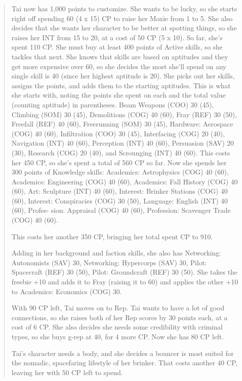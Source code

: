 \begin{quotation}
Tai now has 1,000 points to customize. She wants to be lucky, so she starts
right off spending 60 (4 x 15) CP to raise her Moxie from 1 to 5. She also
decides that she wants her character to be better at spotting things, so she
raises her INT from 15 to 20, at a cost of 50 CP (5 x 10). So far, she’s spent
110 CP.  She must buy at least 400 points of Active skills, so she tackles that
next. She knows that skills are based on aptitudes and they get more
expensive over 60, so she decides the most she’ll spend on any single skill is
40 (since her highest aptitude is 20). She picks out her skills, assigns the
points, and adds them to the starting aptitudes.  This is what she starts with,
noting the points she spent on each and the total value (counting aptitude) in
parentheses.  Beam Weapons (COO) 30 (45), Climbing (SOM) 30 (45), Demolitions
(COG) 40 (60), Fray (REF) 30 (50), Freefall (REF) 40 (60), Freerunning (SOM) 30
(45), Hardware: Aerospace (COG) 40 (60), Infiltration (COO) 30 (45),
Interfacing (COG) 20 (40), Navigation (INT) 40 (60), Perception (INT) 40 (60),
Persuasion (SAV) 20 (30), Research (COG) 20 (40), and Scrounging (INT) 40 (60).
This costs her 450 CP, so she’s spent a total of 560 CP so far.  Now she spends
her 300 points of Knowledge skills: Academics: Astrophysics (COG) 40 (60),
Academics: Engineering (COG) 40 (60), Academics: Fall History (COG) 40 (60),
Art: Sculpture (INT) 40 (60), Interest: Brinker Stations (COG) 40 (60),
Interest: Conspiracies (COG) 30 (50), Language: English (INT) 40 (60), Profes-
sion: Appraisal (COG) 40 (60), Profession: Scavenger Trade (COG) 40 (60).

This costs her another 350 CP, bringing her total spent CP to 910.

Adding in her background and faction skills, she also has Networking:
Autonomists (SAV) 30, Networking: Hypercorps (SAV) 30, Pilot: Spacecraft (REF)
30 (50), Pilot: Groundcraft (REF) 30 (50). She takes the freebie +10 and adds
it to Fray (raising it to 60) and applies the other +10 to Academics: Economics
(COG) 30.

With 90 CP left, Tai moves on to Rep. Tai wants to have a lot of good
connections, so she raises both of her Rep scores by 30 points each, at a cost
of 6 CP. She also decides she needs some credibility with criminal types, so
she buys g-rep at 40, for 4 more CP. Now she has 80 CP left.

Tai’s character needs a body, and she decides a bouncer is most suited for the
nomadic, spacefaring lifestyle of her brinker. That costs another 40 CP,
leaving her with 50 CP left to spend.


\end{quotation}
